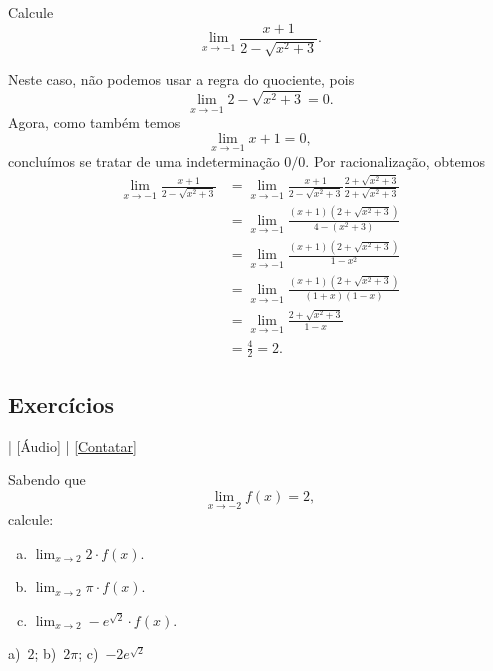\begin{exeresol}
  Calcule
  \begin{equation}
    \lim_{x\to -1} \frac{x+1}{2-\sqrt{x^2+3}}.
  \end{equation}
\end{exeresol}
\begin{resol}
  Neste caso, não podemos usar a regra do quociente, pois
  \begin{equation}
    \lim_{x\to -1} 2-\sqrt{x^2+3} = 0.
  \end{equation}
  Agora, como também temos
  \begin{equation}
    \lim_{x\to -1} x+1 = 0,
  \end{equation}
  concluímos se tratar de uma indeterminação $0/0$. Por racionalização, obtemos
  \begin{align}
    \lim_{x\to -1} \frac{x+1}{2-\sqrt{x^2+3}} &= \lim_{x\to -1} \frac{x+1}{2-\sqrt{x^2+3}}\frac{2+\sqrt{x^2+3}}{2+\sqrt{x^2+3}} \\
                                              &= \lim_{x\to -1} \frac{(x+1)(2+\sqrt{x^2+3})}{4 - (x^2+3)}\\
                                              &= \lim_{x\to -1} \frac{(x+1)(2+\sqrt{x^2+3})}{1-x^2}\\
                                              &= \lim_{x\to -1} \frac{(x+1)(2+\sqrt{x^2+3})}{(1+x)(1-x)}\\
                                              &= \lim_{x\to -1} \frac{2+\sqrt{x^2+3}}{1-x} \\
                                              &= \frac{4}{2} = 2.
  \end{align}
\end{resol}

\subsection*{Exercícios}

\begin{flushright}
  [Vídeo] | [Áudio] | \href{https://phkonzen.github.io/notas/contato.html}{[Contatar]}
\end{flushright}

\begin{exer}
  Sabendo que
  \begin{equation}
    \lim_{x\to -2} f(x) = 2,
  \end{equation}
  calcule:
  \begin{enumerate}[a)]
  \item $\displaystyle \lim_{x\to 2} 2\cdot f(x)$.
  \item $\displaystyle \lim_{x\to 2} \pi\cdot f(x)$.
  \item $\displaystyle \lim_{x\to 2} -e^{\sqrt{2}}\cdot f(x)$.
  \end{enumerate}
\end{exer}
\begin{resp}
  a)~$2$; b)~$2\pi$; c)~$-2e^{\sqrt{2}}$
\end{resp}

